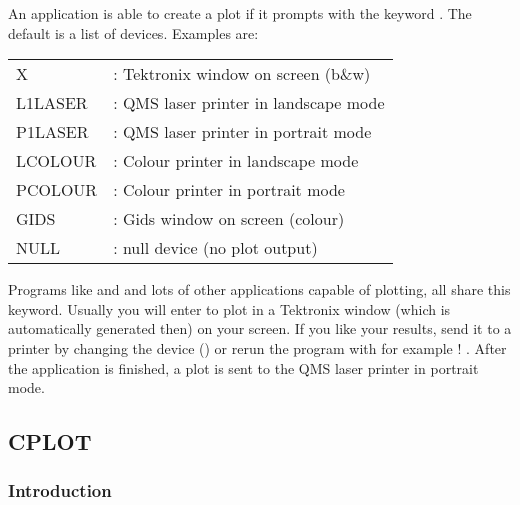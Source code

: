 An application is able to create a plot if it prompts with the keyword
. The default is a list of devices. Examples are:\bigskip

\begin{tabular}{ l l }
                 X        &  : Tektronix window on screen (b\&w)\\
                 L1LASER  &  : QMS laser printer in landscape mode\\
                 P1LASER  &  : QMS laser printer in portrait mode\\
                 LCOLOUR  &  : Colour printer in landscape mode\\
                 PCOLOUR  &  : Colour printer in portrait mode\\
                 GIDS     &  : Gids window on screen (colour)\\
                 NULL     &  : null device (no plot output)\\
\end{tabular}
\medskip



Programs like  and  and lots of other 
applications capable of plotting, all share this keyword. Usually
you will enter  to plot in a Tektronix window (which is 
automatically generated then) on your screen.
If you like your results, send it to a printer by changing the device
() or rerun the program with for example 
! . After the application is 
finished, a plot is sent to the QMS laser printer in portrait mode.



\subsection*{CPLOT}

\subsubsection*{Introduction}

